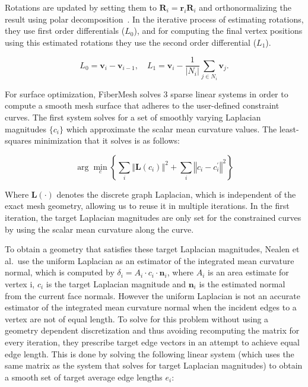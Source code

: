 Rotations are updated by setting them to $\mathbf{R}_{i} = \mathbf{r}_{i}\mathbf{R}_{i}$ and orthonormalizing the result using polar decomposition~\cite{Fu2007}.
In the iterative process of estimating rotations, they use first order differentials ($L_0$), and for computing the final vertex positions using this estimated rotations they use the second order differential ($L_1$). 

\begin{equation*}
L_{0} = \mathbf{v}_{i} - \mathbf{v}_{i-1}, \quad L_{1} = \mathbf{v}_{i} - \frac{1}{\lvert N_{i} \rvert} \sum_{j \in N_{i}} \mathbf{v}_j.
\end{equation*}

For surface optimization, FiberMesh solves 3 sparse linear systems in order to compute a smooth mesh surface that adheres to the user-defined constraint curves. The first system solves for a set of smoothly varying Laplacian magnitudes $\{c_{i}\}$ which approximate the scalar mean curvature values. The least-squares minimization that it solves is as follows: 

\begin{equation}
\arg\min_{c} \left\lbrace \sum_{i} \left\Vert \mathbf{L}\left(c_{i}\right) \right\Vert^{2} + \sum_{i} \left\Vert c_{i} - c_{i}^{'} \right\Vert^{2} \right\rbrace
\end{equation}

Where $\mathbf{L\left(\cdot\right)}$ denotes the discrete graph Laplacian, which is independent of the exact mesh geometry, allowing us to reuse it in multiple iterations.
In the first iteration, the target Laplacian magnitudes are only set for the constrained curves by using the scalar mean curvature along the curve. 

To obtain a geometry that satisfies these target Laplacian magnitudes, Nealen et al.\ use the uniform Laplacian as an estimator of the integrated mean curvature normal, which is computed by $\delta_{i} = A_{i} \cdot c_{i} \cdot \mathbf{n}_{i}$, where $A_{i}$ is an area estimate for vertex i, $c_{i}$ is the target Laplacian magnitude and $\mathbf{n}_{i}$ is the estimated normal from the current face normals. However the uniform Laplacian is not an accurate estimator of the integrated mean curvature normal when the incident edges to a vertex are not of equal length. To solve for this problem without using a geometry dependent discretization and thus avoiding recomputing the matrix for every iteration, they prescribe target edge vectors in an attempt to achieve equal edge length. This is done by solving the following linear system (which uses the same matrix as the system that solves for target Laplacian magnitudes) to obtain a smooth set of target average edge lengths $e_{i}$: 


